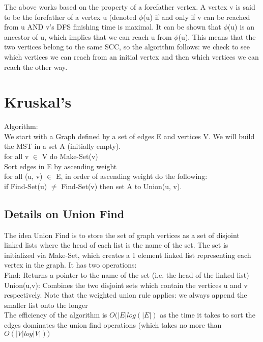 \documentclass{article}
\newcommand\tab[1][1cm]{\hspace*{#1}}
\begin{document}
The above works based on the property of a forefather vertex. A vertex v is said to be the forefather of a vertex u (denoted $\phi$(u) if and only if v can be reached from u AND v's DFS finishing time is maximal. It can be shown that  $\phi$(u) is an ancestor of u, which implies that we can reach u from $\phi$(u). This means that the two vertices belong to the same SCC, so the algorithm follows: we check to see which vertices we can reach from an initial vertex and then which vertices we can reach the other way. 

\section*{Kruskal's}
Algorithm: \\
We start with a Graph defined by a set of edges E and vertices V. We will build the MST in a set A (initially empty).\\
for all v $\in$ V do Make-Set(v) \\
Sort edges in E by ascending weight \\
for all (u, v) $\in$ E, in order of ascending weight do the following: \\
\tab if Find-Set(u) $\neq$ Find-Set(v) then set A to Union(u, v).
\subsection*{Details on Union Find}
The idea Union Find is to store the set of graph vertices as a set of disjoint linked lists where the head of each list is the name of the set. The set is initialized via Make-Set, which creates a 1 element linked list representing each vertex in the graph. It has two operations: \\
Find: Returns a pointer to the name of the set (i.e. the head of the linked list)\\ 
Union(u,v): Combines the two disjoint sets which contain the vertices u and v respectively. Note that the weighted union rule applies: we always append the smaller list onto the longer \\
The efficiency of the algorithm is $O(|E|log(|E|)$ as the time it takes to sort the edges dominates the union find operations (which takes no more than $O(|V|log|V|))$\\
\end{document}
